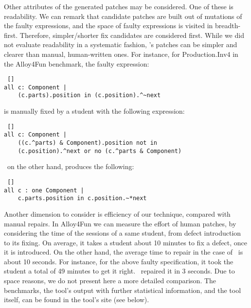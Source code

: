 Other attributes of the generated patches may be considered. One of these is readability. We can remark that candidate patches are built out of mutations of the faulty expressions, and the space of faulty expressions is visited in breadth-first. Therefore, simpler/shorter fix candidates are considered first. While we did not evaluate readability in a systematic fashion, {\technique}'s patches can be simpler and clearer than manual, human-written ones. For instance, for Production.Inv4 in the Alloy4Fun benchmark, the faulty expression:
\begin{lstlisting} []
all c: Component | 
    (c.parts).position in (c.position).^~next
\end{lstlisting} 
is manually fixed by a student with the following expression: 
\begin{lstlisting} []
all c: Component | 
    ((c.^parts) & Component).position not in 
    (c.position).^next or no (c.^parts & Component)
\end{lstlisting}
\technique\, on the other hand, produces the following:
\begin{lstlisting} []
all c : one Component | 
    c.parts.position in c.position.~*next
\end{lstlisting}

Another dimension to consider is efficiency of our technique, compared with manual repairs. In Alloy4Fun we can measure the effort of human patches, by considering the time of the sessions of a same student, from defect introduction to its fixing. On average, it takes a student about 10 minutes to fix a defect, once it is introduced. On the other hand, the average time to repair in the case of \technique\ is about 10 seconds. For instance, for the above faulty specification, it took the student a total of 49 minutes to get it right. \technique\ repaired it in 3 seconds. Due to space reasons, we do not present here a more detailed comparison. The benchmarks, the tool's output with further statistical information, and the tool itself, can be found in the tool's site (see below).  

